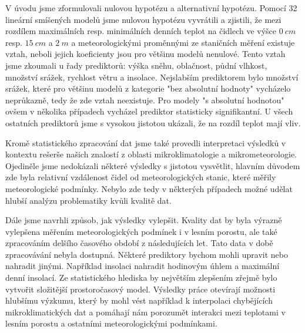 V úvodu jsme zformulovali nulovou hypotézu a alternativní hypotézu. Pomocí 32 lineární smíšených modelů jsme nulovou hypotézu vyvrátili a zjistili, že mezi rozdílem maximálních resp. minimálních denních teplot na čidlech ve výšce $\SI{0}{cm}$ resp. $\SI{15}{cm}$ a $\SI{2}{m}$ a meteorologickými proměnnými ze staničních měření existuje vztah, neboli jejich koeficienty jsou pro většinu modelů nenulové. Tento vztah jsme zkoumali u řady prediktorů: výška sněhu, oblačnost, půdní vlhkost, množství srážek, rychlost větru a insolace. Nejslabším prediktorem bylo množství srážek, které pro většinu modelů z kategorie "bez absolutní hodnoty" vycházelo neprůkazně, tedy že zde vztah neexistuje. Pro modely "s absolutní hodnotou" ovšem v několika případech vycházel prediktor statisticky signifikantní. U všech ostatních prediktorů jsme s vysokou jistotou ukázali, že na rozdíl teplot mají vliv.

Kromě statistického zpracování dat jsme také provedli interpretaci výsledků v kontextu rešerše našich znalostí z oblasti mikroklimatologie a mikrometeorologie. Ojediněle jsme nedokázali některé výsledky s jistotou vysvětlit, hlavním důvodem zde byla relativní vzdálenost čidel od meteorologických stanic, které měřily meteorologické podmínky. Nebylo zde tedy v některých případech možné udělat hlubší analýzu problematiky kvůli kvalitě dat.

Dále jsme navrhli způsob, jak výsledky vylepšit. Kvality dat by byla výrazně vylepšena měřením meteorologických podmínek i v lesním porostu, ale také zpracováním delšího časového období z následujících let. Tato data v době zpracovávání nebyla dostupná. Některé prediktory bychom mohli upravit nebo nahradit jinými. Například insolaci nahradit hodinovým úhlem a maximální denní insolací. Ze statistického hlediska by největším zlepšením zřejmě bylo vytvořit složitější prostoročasový model. Výsledky práce otevírají možnosti hlubšímu výzkumu, který by mohl vést například k interpolaci chybějících mikroklimatických dat a pomáhají nám porozumět interakci mezi teplotami v lesním porostu a ostatními meteorologickými podmínkami.
